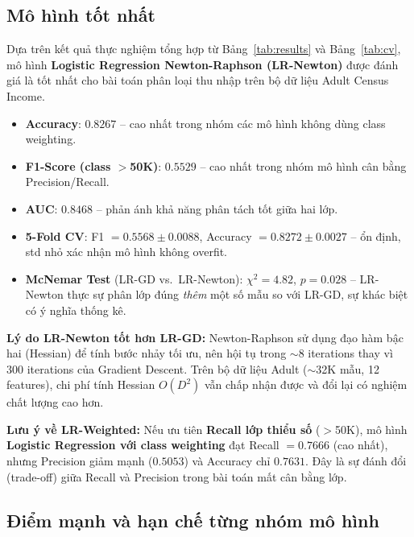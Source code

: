 \documentclass[12pt, a4paper]{article}
\begin{document}
\subsection{Mô hình tốt nhất}

Dựa trên kết quả thực nghiệm tổng hợp từ Bảng~\ref{tab:results} và Bảng~\ref{tab:cv},
mô hình \textbf{Logistic Regression Newton-Raphson (LR-Newton)} được đánh giá là tốt nhất
cho bài toán phân loại thu nhập trên bộ dữ liệu Adult Census Income.

\begin{itemize}
  \item \textbf{Accuracy}: $0.8267$ -- cao nhất trong nhóm các mô hình không dùng class weighting.
  \item \textbf{F1-Score (class $>$50K)}: $0.5529$ -- cao nhất trong nhóm mô hình cân bằng Precision/Recall.
  \item \textbf{AUC}: $0.8468$ -- phản ánh khả năng phân tách tốt giữa hai lớp.
  \item \textbf{5-Fold CV}: F1 $= 0.5568 \pm 0.0088$, Accuracy $= 0.8272 \pm 0.0027$ -- ổn định,
        std nhỏ xác nhận mô hình không overfit.
  \item \textbf{McNemar Test} (LR-GD vs.\ LR-Newton): $\chi^2 = 4.82$, $p = 0.028$ --
        LR-Newton thực sự phân lớp đúng \emph{thêm} một số mẫu so với LR-GD, sự khác biệt có ý nghĩa thống kê.
\end{itemize}

\noindent\textbf{Lý do LR-Newton tốt hơn LR-GD:}
Newton-Raphson sử dụng đạo hàm bậc hai (Hessian) để tính bước nhảy tối ưu, nên hội tụ
trong $\sim$8 iterations thay vì 300 iterations của Gradient Descent.
Trên bộ dữ liệu Adult ($\sim$32K mẫu, 12 features), chi phí tính Hessian $O(D^2)$ vẫn
chấp nhận được và đổi lại có nghiệm chất lượng cao hơn.

\noindent\textbf{Lưu ý về LR-Weighted:} Nếu ưu tiên \textbf{Recall lớp thiểu số} ($>$50K),
mô hình \textbf{Logistic Regression với class weighting} đạt Recall $= 0.7666$ (cao nhất),
nhưng Precision giảm mạnh ($0.5053$) và Accuracy chỉ $0.7631$.
Đây là sự đánh đổi (trade-off) giữa Recall và Precision trong bài toán mất cân bằng lớp.

\subsection{Điểm mạnh và hạn chế từng nhóm mô hình}
\end{document}
